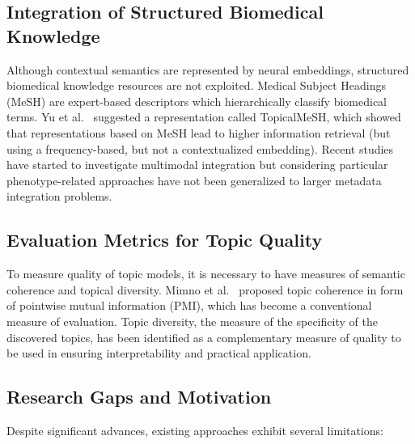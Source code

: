 \documentclass[authorproof,JACIII,researchpaper]{fujipressarticle}
\begin{document}
\subsection{Integration of Structured Biomedical Knowledge}

Although contextual semantics are represented by neural embeddings, structured biomedical knowledge resources are not exploited. Medical Subject Headings (MeSH) are expert-based descriptors which hierarchically classify biomedical terms. Yu et al.~\cite{yu_improving_2016} suggested a representation called TopicalMeSH, which showed that representations based on MeSH lead to higher information retrieval (but using a frequency-based, but not a contextualized embedding). Recent studies have started to investigate multimodal integration but considering particular phenotype-related approaches have not been generalized to larger metadata integration problems.

\subsection{Evaluation Metrics for Topic Quality}

To measure quality of topic models, it is necessary to have measures of semantic coherence and topical diversity. Mimno et al.~\cite{mimno_optimizing_2011} proposed topic coherence in form of pointwise mutual information (PMI), which has become a conventional measure of evaluation. Topic diversity, the measure of the specificity of the discovered topics, has been identified as a complementary measure of quality to be used in ensuring interpretability and practical application.

\subsection{Research Gaps and Motivation}

Despite significant advances, existing approaches exhibit several limitations:
\end{document}
